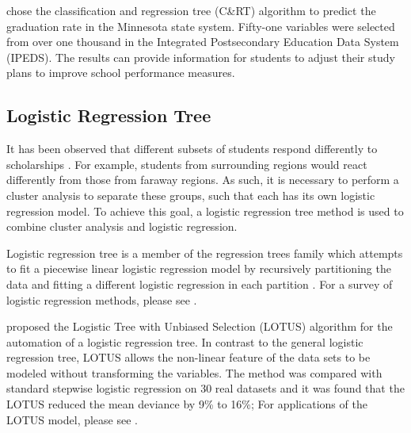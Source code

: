 \documentclass[12pt,english]{report}
\begin{document}

\citet{dt_graduation} chose the classification and regression tree (C\&RT) algorithm to predict the graduation rate in the Minnesota state system. Fifty-one variables were selected from over one thousand in the Integrated Postsecondary Education Data System (IPEDS). The results can provide information for students to adjust their study plans to improve school performance measures.

\subsection{Logistic Regression Tree}

It has been observed that  different subsets of students respond differently to scholarships \citep{Curs2002111,heller1999effects}. For example, students from surrounding regions would react differently from those from faraway regions. As such, it is necessary to perform a cluster analysis to separate these groups, such that each has its own logistic regression model. To achieve this goal, a logistic regression tree method is used to combine cluster analysis and logistic regression.  

Logistic regression tree is a member of the regression trees family which attempts to fit a piecewise linear logistic regression model by recursively partitioning the data and fitting a different logistic regression in each partition \citep{lotus2}. For a survey of logistic regression methods, please see \citep{harrell2013regression_book}.
	
\citet{lotus2} proposed the Logistic Tree with Unbiased Selection (LOTUS) algorithm for the automation of a logistic regression tree. In contrast to the general logistic regression tree, LOTUS allows the non-linear feature of the data sets to be modeled without transforming the variables. The method was compared with standard stepwise logistic regression on 30 real datasets and it was found that the LOTUS reduced the mean deviance by 9\% to 16\%;  For applications of the LOTUS model, please see \citep{lotus_app1,lotus_app2}. 
\end{document}
